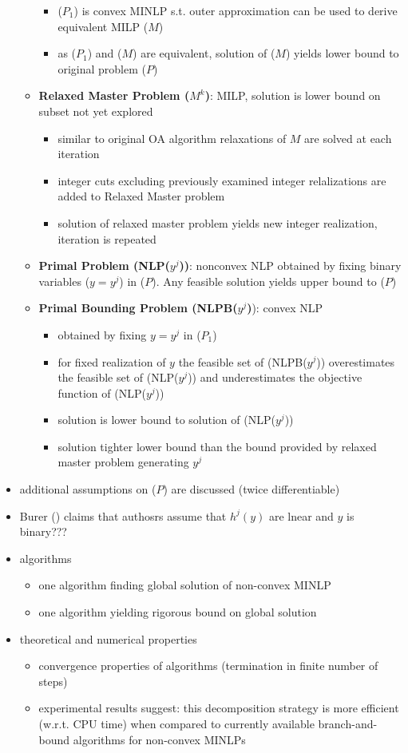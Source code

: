 \documentclass{article}
\begin{document}
\begin{itemize}
\begin{itemize}
\begin{itemize}
		\item ($P_1$) is convex MINLP s.t. outer approximation can be used to derive equivalent MILP ($M$)
		\item as ($P_1$) and ($M$) are equivalent, solution of ($M$) yields lower bound to original problem ($P$)
		\end{itemize}
	\item \textbf{Relaxed Master Problem ($M^k$)}: MILP, solution is lower bound on subset not yet explored
		\begin{itemize}
		\item similar to original OA algorithm relaxations of $M$ are solved at each iteration 
		\item integer cuts excluding previously examined integer relalizations are added to Relaxed Master problem
		\item solution of relaxed master problem yields new integer realization, iteration is repeated
		\end{itemize}
	\item \textbf{Primal Problem (NLP($y^j$))}: nonconvex NLP obtained by fixing binary variables ($y=y^j$) in ($P$). Any feasible solution yields upper bound to ($P$)
	\item \textbf{Primal Bounding Problem (NLPB($y^j$)}): convex NLP
		\begin{itemize}
		\item obtained by fixing $y=y^j$ in ($P_1$)
		\item for fixed realization of $y$ the feasible set of (NLPB($y^j$)) overestimates the feasible set of (NLP($y^j$)) and underestimates the objective function of (NLP($y^j$))
		\item solution is lower bound to solution of (NLP($y^j$))
		\item solution tighter lower bound than the bound provided by relaxed master problem generating $y^j$
		\end{itemize}
	\end{itemize}
\item additional assumptions on ($P$) are discussed (twice differentiable)
\item Burer (\cite{burer2012non}) claims that authosrs assume that $h^j(y)$ are lnear and $y$ is binary???
\item algorithms
	\begin{itemize}
	\item one algorithm finding global solution of non-convex MINLP
	\item one algorithm yielding rigorous bound on global solution
	\end{itemize}
\item theoretical and numerical properties
	\begin{itemize}
	\item convergence properties of algorithms (termination in finite number of steps)
	\item experimental results suggest: this decomposition strategy is more efficient (w.r.t. CPU time) when compared to currently available branch-and-bound algorithms for non-convex MINLPs
	\end{itemize}
\end{itemize}
\newpage
\end{document}
